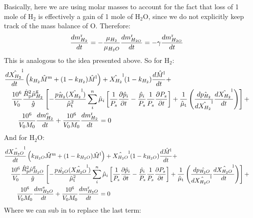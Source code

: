 Basically, here we are using molar masses to account for the fact that loss of 1 mole of H$_2$ is effectively a gain of 1 mole of H$_2$O, since we do not explicitly keep track of the mass balance of O.  Therefore:
\begin{equation}
\frac{dm_{H_2}^{\rm r}}{dt} = - \frac{\mu_{H_2}}{\mu_{H_2O}} \frac{dm_{H_{2O}}^{\rm r}}{dt} = -\gamma \frac{dm_{H_{2O}}^{\rm r}}{dt}
\end{equation}
This is analogous to the idea presented above.  So for H$_2$:
\begin{align}
&\frac{d \hat{X_{H_2}}^{\rm l}}{d t} \left(k_{H_2} \hat{M}^{\rm m} + (1-k_{H_2}) \hat{M}^{\rm l} \right)
+ \hat{X_{H_2}}^{\rm l} (1-k_{H_2}) \frac{d \hat{M}^{\rm l}}{d t} + \nonumber \\
&\quad \frac{10^6}{V_0} \frac{\hat{R}_{\rm p}^2 \hat{\mu}_{H_2}^{\rm g}}{\hat{g}}
\left[
-\frac{\hat{p_{H_2}}(\hat{X_{H_2}}^{\rm l})}{\hat{\mu}_{\rm t}^2} \sum_i^n \hat{\mu}_i \left[ \frac{1}{P_s} \frac{\partial \hat{p}_i}{\partial t} - \frac{\hat{p}_i}{P_s} \frac{1}{P_s} \frac{\partial P_s}{\partial t} \right] + \frac{1}{\hat{\mu}_{\rm t}} \left( \frac{d \hat{p_{H_2}}}{d \hat{X_{H_2}}^{\rm l}} \frac{d \hat{X_{H_2}}^{\rm l}}{d t} \right)
\right]+ \nonumber \\
& \qquad \frac{10^6}{V_0 M_0} \frac{dm_{H_2}^{\rm e}}{dt} + \frac{10^6}{V_0 M_0} \frac{dm_{H_2}^{\rm r}}{dt} = 0
\end{align}
And for H$_2$O:
\begin{align}
&\frac{d \hat{X_{H_2O}}^{\rm l}}{d t} \left(k_{H_2O} \hat{M}^{\rm m} + (1-k_{H_2O}) \hat{M}^{\rm l} \right)
+ \hat{X_{H_2O}}^{\rm l} (1-k_{H_2O}) \frac{d \hat{M}^{\rm l}}{d t} + \nonumber \\
&\quad \frac{10^6}{V_0} \frac{\hat{R}_{\rm p}^2 \hat{\mu}_{H_2O}^{\rm g}}{\hat{g}}
\left[
-\frac{\hat{p_{H_2O}}(\hat{X_{H_2O}}^{\rm l})}{\hat{\mu}_{\rm t}^2} \sum_i^n \hat{\mu}_i \left[ \frac{1}{P_s} \frac{\partial \hat{p}_i}{\partial t} - \frac{\hat{p}_i}{P_s} \frac{1}{P_s} \frac{\partial P_s}{\partial t} \right] + \frac{1}{\hat{\mu}_{\rm t}} \left( \frac{d \hat{p_{H_2O}}}{d \hat{X_{H_2O}}^{\rm l}} \frac{d \hat{X_{H_2O}}^{\rm l}}{d t} \right)
\right]+ \nonumber \\
& \qquad \frac{10^6}{V_0 M_0} \frac{dm_{H_2O}^{\rm e}}{dt} + \frac{10^6}{V_0 M_0} \frac{dm_{H_2O}^{\rm r}}{dt} = 0
\end{align}
Where we can sub in to replace the last term:
